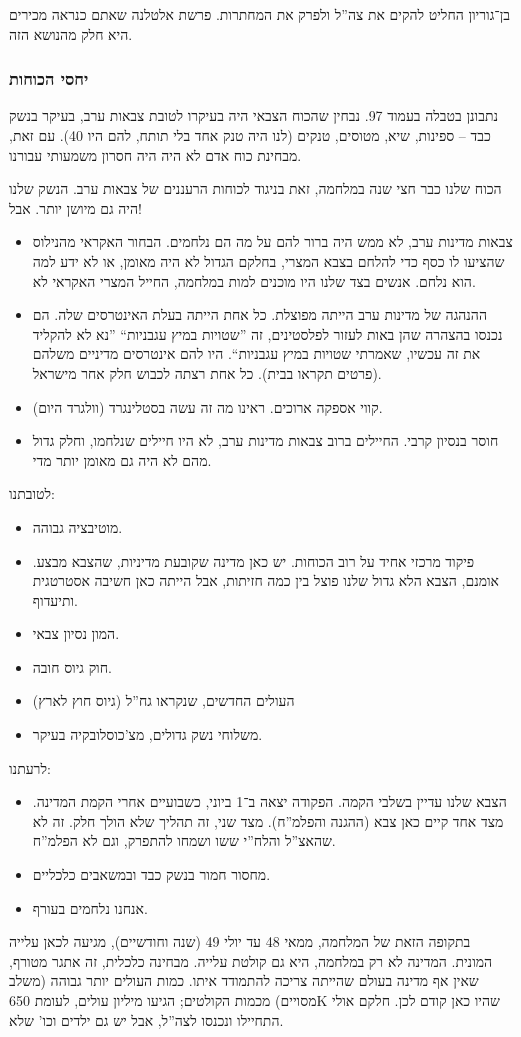 \documentclass[]{../../../../tex/classes/styledArticle}
\begin{document}
	בן־גוריון החליט להקים את צה''ל ולפרק את המחתרות. פרשת אלטלנה שאתם כנראה מכירים היא חלק מהנושא הזה. 
	
	\subsubsection*{יחסי הכוחות}
	נתבונן בטבלה בעמוד 97. נבחין שהכוח הצבאי היה בעיקרו לטובת צבאות ערב, בעיקר בנשק כבד – ספינות, שיא, מטוסים, טנקים (לנו היה טנק אחד בלי תותח, להם היו 40). עם זאת, מבחינת כוח אדם לא היה היה חסרון משמעותי עבורנו. 
	
	הכוח שלנו כבר חצי שנה במלחמה, זאת בניגוד לכוחות הרעננים של צבאות ערב. הנשק שלנו היה גם מיושן יותר. אבל!
	\begin{itemize}
		\item צבאות מדינות ערב, לא ממש היה ברור להם על מה הם נלחמים. הבחור האקראי מהנילוס שהציעו לו כסף כדי להלחם בצבא המצרי, בחלקם הגדול לא היה מאומן, או לא ידע למה הוא נלחם. אנשים בצד שלנו היו מוכנים למות במלחמה, החייל המצרי האקראי לא. 
		\item ההנהגה של מדינות ערב הייתה מפוצלת. כל אחת הייתה בעלת האינטרסים שלה. הם נכנסו בהצהרה שהן באות לעזור לפלסטינים, זה ''שטויות במיץ עגבניות`` ''נא לא להקליד את זה עכשיו, שאמרתי שטויות במיץ עגבניות``. היו להם אינטרסים מדיניים משלהם (פרטים תקראו בבית). כל אחת רצתה לכבוש חלק אחר מישראל. 
		\item קווי אספקה ארוכים. ראינו מה זה עשה בסטלינגרד (וולגרד היום). 
		\item חוסר בנסיון קרבי. החיילים ברוב צבאות מדינות ערב, לא היו חיילים שנלחמו, וחלק גדול מהם לא היה גם מאומן יותר מדי. 
	\end{itemize}
	לטובתנו: 
	\begin{itemize}
		\item מוטיבציה גבוהה. 
		\item פיקוד מרכזי אחיד על רוב הכוחות. יש כאן מדינה שקובעת מדיניות, שהצבא מבצע. אומנם, הצבא הלא גדול שלנו פוצל בין כמה חזיתות, אבל הייתה כאן חשיבה אסטרטגית ותיעדוף. 
		\item המון נסיון צבאי. 
		\item חוק גיוס חובה. 
		\item העולים החדשים, שנקראו גח''ל (גיוס חוץ לארץ)
		\item משלוחי נשק גדולים, מצ'כוסלובקיה בעיקר. 
	\end{itemize}
	לרעתנו: 
	\begin{itemize}
		\item הצבא שלנו עדיין בשלבי הקמה. הפקודה יצאה ב־1 ביוני, כשבועיים אחרי הקמת המדינה. מצד אחד קיים כאן צבא (ההגנה והפלמ''ח). מצד שני, זה תהליך שלא הולך חלק. זה לא שהאצ''ל והלח''י ששו ושמחו להתפרק, וגם לא הפלמ''ח. 
		\item מחסור חמור בנשק כבד ובמשאבים כלכליים. 
		\item אנחנו נלחמים בעורף. 
	\end{itemize}
	בתקופה הזאת של המלחמה, ממאי 48 עד יולי 49 (שנה וחודשיים), מגיעה לכאן עלייה המונית. המדינה לא רק במלחמה, היא גם קולטת עלייה. מבחינה כלכלית, זה אתגר מטורף, שאין אף מדינה בעולם שהייתה צריכה להתמודד איתו. כמות העולים יותר גבוהה (משלב מסויים) מכמות הקולטים; הגיעו מיליון עולים, לעומת 650K שהיו כאן קודם לכן. חלקם אולי התחיילו ונכנסו לצה''ל, אבל יש גם ילדים וכו' שלא. 
	
\end{document}
